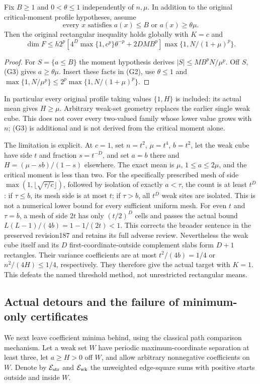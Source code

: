 \begin{theorem}\label{thm:geo-gap}
Fix $B\geq1$ and $0<\theta\leq1$ independently of $n,\mu$. In addition
to the original critical-moment profile hypotheses, assume
\[
 \text{every }x\text{ satisfies }a(x)\leq B\text{ or }a(x)\geq\theta\mu.
                                                                    \tag{G3}
\]
Then the original rectangular inequality holds globally with $K=c$ and
\[
 \dim F\leq h2^p\left[4^D\max\{1,c^p\}\theta^{-p}+2DMB^p\right]
             \max\{1,N/(1+\mu)^p\}.
\]
\end{theorem}
\begin{proof}
For $S=\{a\leq B\}$ the moment hypothesis derives
$|S|\leq MB^pN/\mu^p$. Off $S$, (G3) gives $a\geq\theta\mu$.
Insert these facts in (G2), use $\theta\leq1$ and
$\max\{1,N/\mu^p\}\leq2^p\max\{1,N/(1+\mu)^p\}$.
\end{proof}
In particular every original profile taking values $\{1,H\}$ is included:
its actual mean gives $H\geq\mu$. Arbitrary weak-set geometry replaces the
earlier single weak cube. This does not cover every two-valued family
whose lower value grows with $n$; (G3) is additional and is not derived
from the critical moment alone.

The limitation is explicit. At $c=1$, set $n=t^2$, $\mu=t^4$, $b=t^2$,
let the weak cube have side $t$ and fraction $s=t^{-D}$, and set
$a=b$ there and $H=(\mu-sb)/(1-s)$ elsewhere. The exact mean is $\mu$,
$1\leq a\leq2\mu$, and the critical moment is less than two.
For the specifically prescribed mesh of side
$\max(1,\lfloor\sqrt{\tau/c}\rfloor)$, followed by isolation of exactly
$a<\tau$, the count is at least $t^D$: if $\tau\le b$, its mesh side is
at most $t$; if $\tau>b$, all $t^D$ weak sites are isolated. This is not
a numerical lower bound for every sufficient uniform mesh. For even $t$
and $\tau=b$, a mesh of side $2t$ has only $(t/2)^D$ cells and passes the
actual bound $L(L-1)/(4b)=1-1/(2t)<1$. This corrects the broader sentence
in the preserved revision187 and retains its full adverse review.
Nevertheless the weak cube itself and its $D$ first-coordinate-outside
complement slabs form $D+1$ rectangles. Their variance coefficients are
at most $t^2/(4b)=1/4$ or $n^2/(4H)\leq1/4$, respectively.
They therefore give the actual target with $K=1$. This defeats the named
threshold method, not unrestricted rectangular means.

\subsection{Actual detours and the failure of minimum-only certificates}
We next leave coefficient minima behind, using the classical path
comparison mechanism\cite{geo:comparison}. Let a weak set $W$ have periodic
maximum-coordinate separation at least three, let $a\geq H>0$ off $W$,
and allow arbitrary nonnegative coefficients on $W$. Denote by
$\mathcal E_{\rm str}$ and $\mathcal E_{\rm wk}$ the unweighted edge-square sums with
positive starts outside and inside $W$.

